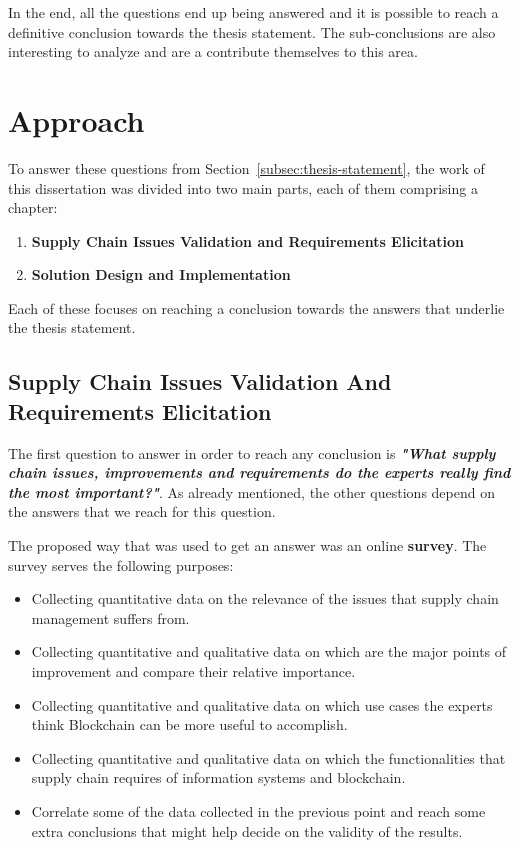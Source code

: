 In the end, all the questions end up being answered and it is possible to reach a definitive conclusion towards the thesis statement. The sub-conclusions are also interesting to analyze and are a contribute themselves to this area.

\section{Approach}

To answer these questions from Section~\ref{subsec:thesis-statement}, the work of this dissertation was divided into two main parts, each of them comprising a chapter:
\begin{enumerate}
\item \textbf{Supply Chain Issues Validation and Requirements Elicitation}
\item \textbf{Solution Design and Implementation}
\end{enumerate}

Each of these focuses on reaching a conclusion towards the answers that underlie the thesis statement.

\subsection{Supply Chain Issues Validation And Requirements Elicitation}
\label{sec:survey-approach}
The first question to answer in order to reach any conclusion is \textbf{\textit{"What supply chain issues, improvements and requirements do the experts really find the most important?"}}. As already mentioned, the other questions depend on the answers that we reach for this question.

The proposed way that was used to get an answer was an online \textbf{survey}. The survey serves the following purposes:

\begin{itemize}
\item Collecting quantitative data on the relevance of the issues that supply chain management suffers from.
\item Collecting quantitative and qualitative data on which are the major points of improvement and compare their relative importance.
\item Collecting quantitative and qualitative data on which use cases the experts think Blockchain can be more useful to accomplish.
\item Collecting quantitative and qualitative data on which the functionalities that supply chain requires of information systems and blockchain.
\item Correlate some of the data collected in the previous point and reach some extra conclusions that might help decide on the validity of the results.
\end{itemize}

